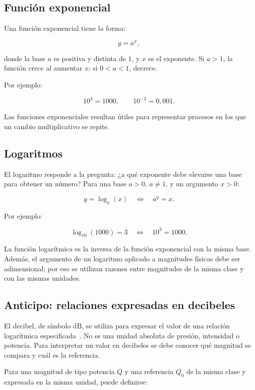 \subsection{Función exponencial}
\label{sec:u1-exponencial}

Una función exponencial tiene la forma:

\[
    y=a^{x},
\]

donde la base \(a\) es positiva y distinta de \(1\), y \(x\) es el exponente. Si \(a>1\), la función crece al aumentar \(x\); si \(0<a<1\), decrece.

Por ejemplo:

\[
    10^{3}=1000,
    \qquad
    10^{-3}=0{,}001.
\]

Las funciones exponenciales resultan útiles para representar procesos en los que un cambio multiplicativo se repite.

\subsection{Logaritmos}
\label{sec:u1-logaritmos}

El logaritmo responde a la pregunta: ¿a qué exponente debe elevarse una base para obtener un número? Para una base \(a>0\), \(a\neq1\), y un argumento \(x>0\):

\[
    y=\log_{a}(x)
    \quad\Longleftrightarrow\quad
    a^{y}=x.
\]

Por ejemplo:

\[
    \log_{10}(1000)=3
    \quad\Longleftrightarrow\quad
    10^{3}=1000.
\]

La función logarítmica es la inversa de la función exponencial con la misma base. Además, el argumento de un logaritmo aplicado a magnitudes físicas debe ser adimensional; por eso se utilizan razones entre magnitudes de la misma clase y con las mismas unidades.

\subsection{Anticipo: relaciones expresadas en decibeles}
\label{sec:u1-decibel}

El decibel, de símbolo \(\text{dB}\), se utiliza para expresar el valor de una relación logarítmica especificada~\cite{nistSP811}. No es una unidad absoluta de presión, intensidad o potencia. Para interpretar un valor en decibeles se debe conocer qué magnitud se compara y cuál es la referencia.

Para una magnitud de tipo potencia \(Q\) y una referencia \(Q_0\) de la misma clase y expresada en la misma unidad, puede definirse:

